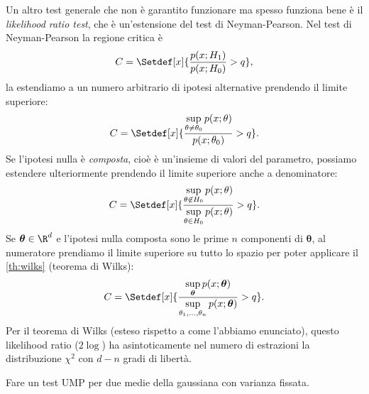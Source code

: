 Un altro test generale che non è garantito funzionare ma spesso funziona bene
è il \emph{likelihood ratio test}, che è un'estensione del test di Neyman-Pearson.
Nel test di Neyman-Pearson la regione critica è
\begin{equation*}
	C = \Setdef[x]{\frac{p(x;H_1)}{p(x;H_0)} > q},
\end{equation*}
la estendiamo a un numero arbitrario di ipotesi alternative prendendo il limite superiore:
\begin{equation*}
	C = \Setdef[x]{\frac {\sup\limits_{\theta\neq\theta_0} p(x;\theta)} {p(x;\theta_0)} > q}.
\end{equation*}
Se l'ipotesi nulla è \emph{composta},
cioè è un'insieme di valori del parametro,
possiamo estendere ulteriormente prendendo il limite superiore anche a denominatore:
\begin{equation*}
	C = \Setdef[x]{\frac {\sup\limits_{\theta\not\in H_0} p(x;\theta)} {\sup\limits_{\theta\in H_0} p(x;\theta)} > q}.
\end{equation*}
Se $\boldsymbol\theta\in\R^d$
e l'ipotesi nulla composta sono le prime $n$ componenti di $\boldsymbol\theta$,
al numeratore prendiamo il limite superiore su tutto lo spazio
per poter applicare il \autoref{th:wilks} (teorema di Wilks):
\begin{equation*}
	C = \Setdef[x]{\frac
	{\sup\limits_{\boldsymbol\theta} p(x;\boldsymbol\theta)}
	{\sup\limits_{\theta_1,\dotsc,\theta_n} p(x;\boldsymbol\theta)} > q}.
\end{equation*}
Per il teorema di Wilks (esteso rispetto a come l'abbiamo enunciato),
questo likelihood ratio ($2\log$) ha asintoticamente nel numero di estrazioni
la distribuzione $\chi^2$ con $d-n$ gradi di libertà.



\begin{exercise}
	Fare un test UMP per due medie della gaussiana con varianza fissata.
\end{exercise}

